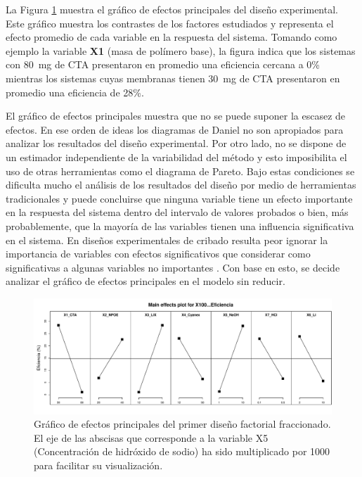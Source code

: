 La Figura  \ref{fig:FrF2-ME.1} muestra el gráfico de efectos principales del diseño experimental. Este gráfico muestra los contrastes de los factores estudiados y representa el efecto promedio de cada variable en la respuesta del sistema. Tomando como ejemplo la variable \textbf{X1} (masa de polímero base), la figura indica que los sistemas con 80~mg de CTA presentaron en promedio una eficiencia cercana a 0\% mientras los sistemas cuyas membranas tienen 30~mg de CTA presentaron en promedio una eficiencia de 28\%. 

El gráfico de efectos principales muestra que no se puede suponer la escasez de efectos. En ese orden de ideas los diagramas de Daniel no son apropiados para analizar los resultados del diseño experimental. Por otro lado, no se dispone de un estimador independiente de la variabilidad del método y esto imposibilita el uso de otras herramientas como el diagrama de Pareto. Bajo estas condiciones se dificulta mucho el análisis de los resultados del diseño por medio de herramientas {tradicionales} y puede concluirse que ninguna variable tiene un efecto importante en la respuesta del sistema dentro del intervalo de valores probados o bien, más probablemente, que la mayoría de las variables tienen una influencia significativa en el sistema. En diseños experimentales de cribado resulta peor ignorar la importancia de variables con efectos significativos que considerar como significativas a algunas variables no importantes \citep{FrF2}. Con base en esto, se decide analizar el gráfico de efectos principales en el modelo sin reducir.

\begin{figure}[H]
    \includegraphics[width=\textwidth, trim = {0 1cm 0 1.34cm}, clip]{chap5/figures/MEP1.pdf}
    \caption[Gráfico de efectos principales del primer diseño factorial fraccionado.]{Gráfico de efectos principales del primer diseño factorial fraccionado. El eje de las abscisas que corresponde a la variable X5 (Concentración de hidróxido de sodio) ha sido multiplicado por 1000 para facilitar su visualización.}
    \label{fig:FrF2-ME.1}
\end{figure}

